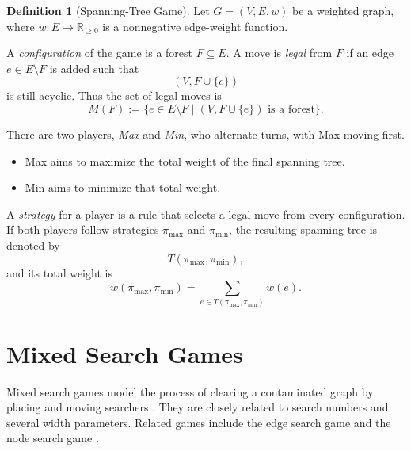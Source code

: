 \documentclass[10pt]{book}
\theoremstyle{definition}
\newtheorem{definition}[theorem]{Definition}
\begin{document}
\begin{definition}[Spanning-Tree Game]
\cite{cardinal2013stackelberg}
Let \(G=(V,E,w)\) be a weighted graph, where \(w:E\to \mathbb{R}_{\geq 0}\) is a nonnegative edge-weight function.

A \emph{configuration} of the game is a forest \(F\subseteq E\).  
A move is \emph{legal} from \(F\) if an edge \(e\in E\setminus F\) is added such that
\[
(V,F\cup\{e\})
\]
is still acyclic.  
Thus the set of legal moves is
\[
M(F):=\{e\in E\setminus F \mid (V,F\cup\{e\}) \text{ is a forest}\}.
\]

There are two players, \emph{Max} and \emph{Min}, who alternate turns, with Max moving first.
\begin{itemize}
    \item Max aims to maximize the total weight of the final spanning tree.
    \item Min aims to minimize that total weight.
\end{itemize}

A \emph{strategy} for a player is a rule that selects a legal move from every configuration.  
If both players follow strategies \(\pi_{\max}\) and \(\pi_{\min}\), the resulting spanning tree is denoted by
\[
T(\pi_{\max},\pi_{\min}),
\]
and its total weight is
\[
w(\pi_{\max},\pi_{\min})
=
\sum_{e\in T(\pi_{\max},\pi_{\min})} w(e).
\]
\end{definition}

\section{Mixed Search Games}

Mixed search games model the process of clearing a contaminated graph by placing and moving searchers \cite{bienstock1991monotonicity,best2016contraction,heggernes2008mixed,fomin2007mixed,takahashi1995mixed}.  
They are closely related to search numbers and several width parameters.  
Related games include the edge search game and the node search game \cite{giannopoulou2011min}.
\end{document}
